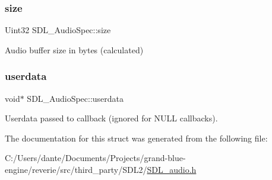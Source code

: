 \subsubsection{\texorpdfstring{size}{size}}
{\footnotesize\ttfamily Uint32 S\+D\+L\+\_\+\+Audio\+Spec\+::size}

Audio buffer size in bytes (calculated) \mbox{\label{struct_s_d_l___audio_spec_aeec9481666f5f0982c98d3878f175d9b}} 
\subsubsection{\texorpdfstring{userdata}{userdata}}
{\footnotesize\ttfamily void$\ast$ S\+D\+L\+\_\+\+Audio\+Spec\+::userdata}

Userdata passed to callback (ignored for N\+U\+LL callbacks). 

The documentation for this struct was generated from the following file\+:\begin{DoxyCompactItemize}
\item 
C\+:/\+Users/dante/\+Documents/\+Projects/grand-\/blue-\/engine/reverie/src/third\+\_\+party/\+S\+D\+L2/\mbox{\hyperlink{_s_d_l__audio_8h}{S\+D\+L\+\_\+audio.\+h}}\end{DoxyCompactItemize}
